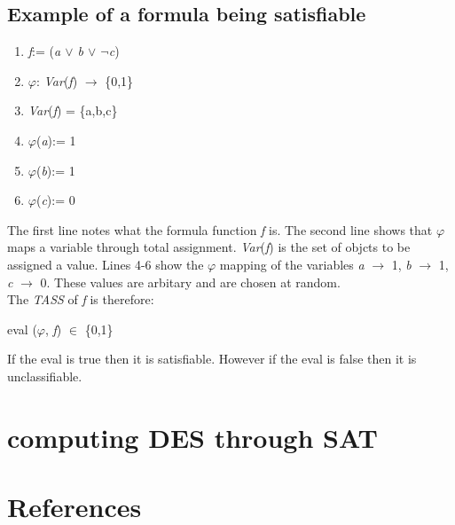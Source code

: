 \documentclass[11pt,a4paper]{article}
\begin{document}
\subsection{Example of a formula being satisfiable}

\begin{enumerate}
\item \textit{f}:= (\textit{a $\lor$ b $\lor$ $\neg$c})
\item $\varphi$: \textit{Var}(\textit{f}) $\rightarrow$ \{0,1\}
\item \textit{Var}(\textit{f}) = \{a,b,c\}
\item $\varphi$(\textit{a}):= 1
\item $\varphi$(\textit{b}):= 1
\item $\varphi$(\textit{c}):= 0
\end{enumerate}

The first line notes what the formula function \textit{f} is. The second line shows that $\varphi$ maps a variable through total assignment. \textit{Var}(\textit{f}) is the set of objcts to be assigned a value. Lines 4-6 show the $\varphi$ mapping of the variables \textit{a} $\rightarrow$ 1, \textit{b} $\rightarrow$ 1, \textit{c} $\rightarrow$ 0. These values are arbitary and are chosen at random. \\
The \textit{TASS} of \textit{f} is therefore:

\begin{center}
eval ($\varphi$, \textit{f}) $\in$ \{0,1\}
\end{center}
If the eval is true then it is satisfiable. However if the eval is false then it is unclassifiable. 


\newpage
\section{computing DES through SAT}
\section{References}
\end{document}
